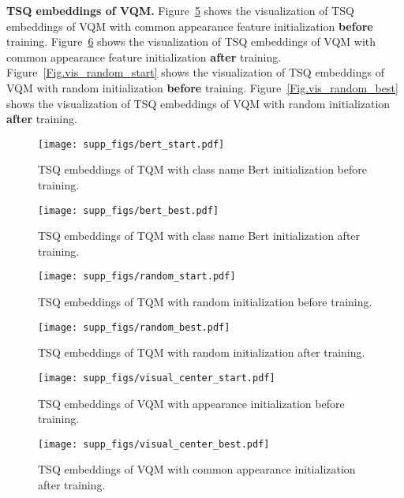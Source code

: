 \documentclass[runningheads]{llncs}
\newcommand{\figref}[1]{Figure~\ref{#1}}
\begin{document}
\noindent \textbf{TSQ embeddings of VQM.}
\figref{Fig.vis_center_start} shows the visualization of TSQ embeddings of VQM with common appearance feature initialization \textbf{before} training.
\figref{Fig.vis_center_best} shows the visualization of TSQ embeddings of VQM with common appearance feature initialization \textbf{after} training.
\figref{Fig.vis_random_start} shows the visualization of TSQ embeddings of VQM with random initialization \textbf{before} training.
\figref{Fig.vis_random_best} shows the visualization of TSQ embeddings of VQM with random initialization \textbf{after} training.


\begin{figure}[ht] \centering \texttt{[image: supp\_figs/bert\_start.pdf]} \caption{TSQ embeddings of TQM with class name Bert initialization before training.} \label{Fig.bert_start} \end{figure}
 
\begin{figure}[t] \centering \texttt{[image: supp\_figs/bert\_best.pdf]} \caption{TSQ embeddings of TQM with class name Bert initialization after training.} \label{Fig.bert_best} \end{figure}

\begin{figure}[t] \centering \texttt{[image: supp\_figs/random\_start.pdf]} \caption{TSQ embeddings of TQM with random  initialization before training.} \label{Fig.random_start} \end{figure}

\begin{figure}[t] \centering \texttt{[image: supp\_figs/random\_best.pdf]} \caption{TSQ embeddings of TQM with random  initialization after training.} \label{Fig.random_best} \end{figure}

\begin{figure}[t] \centering \texttt{[image: supp\_figs/visual\_center\_start.pdf]} \caption{TSQ embeddings of VQM with appearance  initialization before training.} \label{Fig.vis_center_start} \end{figure}

\begin{figure}[t] \centering \texttt{[image: supp\_figs/visual\_center\_best.pdf]} \caption{TSQ embeddings of VQM with common appearance  initialization after training.} \label{Fig.vis_center_best} \end{figure}
\end{document}
